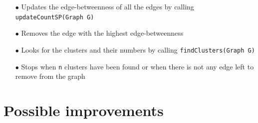 \documentclass{article}
\begin{document}
\begin{itemize}
\item[$\bullet$] Updates the edge-betweenness of all the edges by calling \texttt{updateCountSP(Graph G)}
\item[$\bullet$] Removes the edge with the highest edge-betweenness
\item[$\bullet$] Looks for the clusters and their numbers by calling \texttt{findClusters(Graph G)}
\item[$\bullet$] Stops when \texttt{n} clusters have been found or when there is not any edge left to remove from the graph
\end{itemize}

\newpage

\section{Possible improvements}
\end{document}
